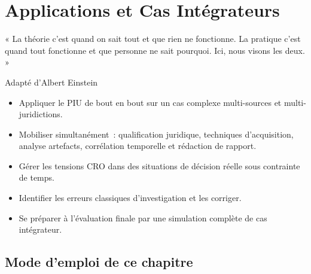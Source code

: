 
\chapter{Applications et Cas Intégrateurs}
\label{chap:cas-int}

\epigraph{%
    « La théorie c'est quand on sait tout et que rien ne fonctionne.
    La pratique c'est quand tout fonctionne et que personne ne sait
    pourquoi. Ici, nous visons les deux. »%
}{Adapté d'Albert Einstein}


\begin{boxobjectifs}
\begin{itemize}
    \item Appliquer le PIU de bout en bout sur un cas complexe
          multi-sources et multi-juridictions.
    \item Mobiliser simultanément~: qualification juridique,
          techniques d'acquisition, analyse artefacts, corrélation
          temporelle et rédaction de rapport.
    \item Gérer les tensions CRO dans des situations de décision
          réelle sous contrainte de temps.
    \item Identifier les erreurs classiques d'investigation et
          les corriger.
    \item Se préparer à l'évaluation finale par une simulation
          complète de cas intégrateur.
\end{itemize}
\end{boxobjectifs}

\bigskip

\section*{Mode d'emploi de ce chapitre}

